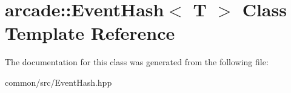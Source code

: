 \hypertarget{classarcade_1_1EventHash}{}\section{arcade\+:\+:Event\+Hash$<$ T $>$ Class Template Reference}
\label{classarcade_1_1EventHash}


The documentation for this class was generated from the following file\+:\begin{DoxyCompactItemize}
\item 
common/src/Event\+Hash.\+hpp\end{DoxyCompactItemize}
